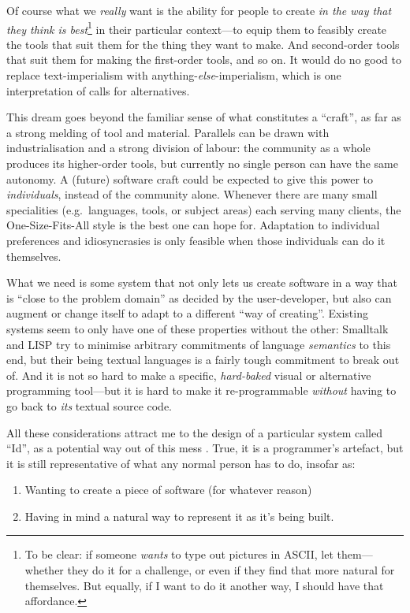 Of course what we \emph{really} want is the ability for people to create
\emph{in the way that they think is best}\footnote{To be clear: if
  someone \emph{wants} to type out pictures in ASCII, let them---whether
  they do it for a challenge, or even if they find that more natural for
  themselves. But equally, if I want to do it another way, I should have
  that affordance.} in their particular context---to equip them to
feasibly create the tools that suit them for the thing they want to
make. And second-order tools that suit them for making the first-order
tools, and so on. It would do no good to replace text-imperialism with
anything-\emph{else}-imperialism, which is one interpretation of calls
for alternatives.

This dream goes beyond the familiar sense of what constitutes a
``craft'', as far as a strong melding of tool and material. Parallels
can be drawn with industrialisation and a strong division of labour: the
community as a whole produces its higher-order tools, but currently no
single person can have the same autonomy. A (future) software craft
could be expected to give this power to \emph{individuals}, instead of
the community alone. Whenever there are many small specialities
(e.g.~languages, tools, or subject areas) each serving many clients, the
One-Size-Fits-All{} style is the best one can hope for. Adaptation to
individual preferences and idiosyncrasies is only feasible when those
individuals can do it themselves.

What we need is some system that not only lets us create software in a
way that is ``close to the problem domain'' as decided by the
user-developer, but also can augment or change itself to adapt to a
different ``way of creating''. Existing systems seem to only have one of
these properties without the other: Smalltalk and LISP try to minimise
arbitrary commitments of language \emph{semantics} to this end, but
their being textual languages is a fairly tough commitment to break out
of. And it is not so hard to make a specific, \emph{hard-baked} visual
or alternative programming tool---but it is hard to make it
re-programmable \emph{without} having to go back to \emph{its} textual
source code.

All these considerations attract me to the design of a particular system
called ``Id'', as a potential way out of this mess \cite{OROM}. True, it
is a programmer's artefact, but it is still representative of what any
normal person has to do, insofar as:

\begin{enumerate}
\def\labelenumi{\alph{enumi})}
\tightlist
\item
  Wanting to create a piece of software (for whatever reason)
\item
  Having in mind a natural way to represent it as it's being built.
\end{enumerate}

